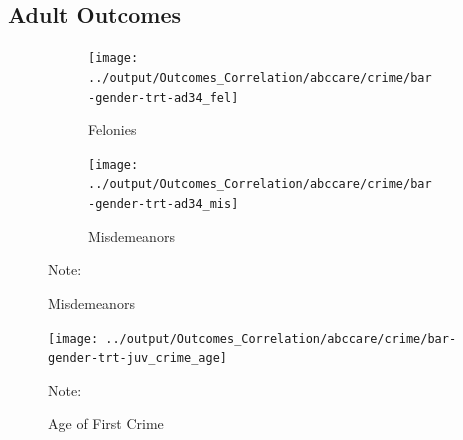 %	

\subsection{Adult Outcomes}

\begin{figure}[H]
\begin{center}
\caption{Crime}
\label{fig:}	
	\begin{subfigure}[b]{0.49\textwidth}
		\centering
		\caption{Felonies}
			\texttt{[image: ../output/Outcomes\_Correlation/abccare/crime/bar-gender-trt-ad34\_fel]}
		\end{subfigure}
	\begin{subfigure}[b]{0.49\textwidth}
		\centering
		\caption{Misdemeanors}
			\texttt{[image: ../output/Outcomes\_Correlation/abccare/crime/bar-gender-trt-ad34\_mis]}
	\end{subfigure}
	\end{center}
\raggedright \footnotesize
Note:
\end{figure}

\begin{figure}[H]
\begin{center}
\caption{Age of First Crime}
\label{fig:age-first-crime}
	\texttt{[image: ../output/Outcomes\_Correlation/abccare/crime/bar-gender-trt-juv\_crime\_age]}
\end{center}
\raggedright \footnotesize
Note:
\end{figure}